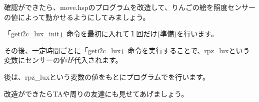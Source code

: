 確認ができたら、move.hspのプログラムを改造して、りんごの絵を照度センサーの値によって動かせるようにしてみましょう。


\begin{description}
    \item {}
\end{description}


「geti2c\_lux\_init」命令を最初に入れて１回だけ(準備)を行います。

その後、一定時間ごとに「geti2c\_lux」命令を実行することで、rpz\_luxという変数にセンサーの値が代入されます。

後は、rpz\_luxという変数の値をもとにプログラムでを行います。

改造ができたらTAや周りの友達にも見せてあげましょう。

